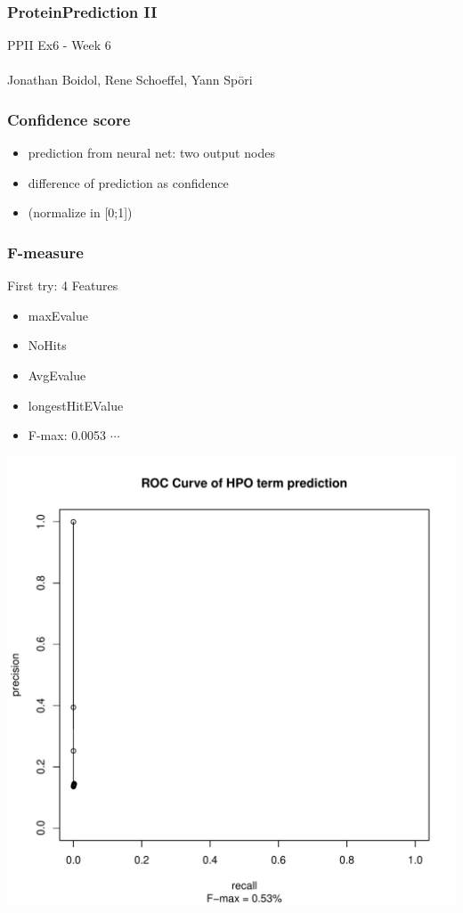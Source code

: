 \documentclass{beamer}
\begin{document}
\begin{frame}
 \frametitle{ProteinPrediction II}
 PPII Ex6 - Week 6\\
 \hfill \\
 Jonathan Boidol, Rene Schoeffel, Yann Sp\"ori
\end{frame}

\begin{frame}
  \frametitle{Confidence score}
 	\begin{itemize}
 		\item prediction from neural net: two output nodes 
 		\item difference of prediction as confidence
 		\item (normalize in [0;1])
 	\end{itemize}

\end{frame}

\begin{frame}
	\frametitle{F-measure}
	\begin{minipage}{0.45\textwidth}
	First try: 4 Features
	\begin{itemize}
		\item maxEvalue
		\item NoHits
		\item AvgEvalue
		\item longestHitEValue
		\item F-max: 0.0053 $\cdots$
	\end{itemize}
	\end{minipage}
	\begin{minipage}{0.5\textwidth}
		\centering
		\includegraphics[width=\textwidth]{../../data/ROC_1.pdf}
	
	\end{minipage}

\end{frame}
	
\end{document}
